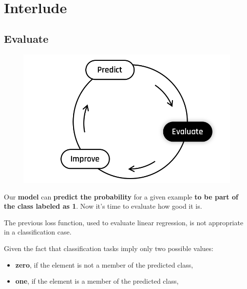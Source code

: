 
\section*{Interlude}
\subsection*{Evaluate}

\begin{figure}[!h]
    \centering
    \includegraphics[scale=0.25]{assets/Evaluate.png}
\end{figure}

Our \textbf{model} can \textbf{predict the probability} for a given example \textbf{to be part of the class labeled as 1}.  
Now it's time to evaluate how good it is.

The previous loss function, used to evaluate linear regression, is not appropriate in a classification case.

Given the fact that classification tasks imply only two possible values:
\begin{itemize}
    \item \textbf{zero}, if the element is not a member of the predicted class,
    \item \textbf{one}, if the element is a member of the predicted class,
\end{itemize}


